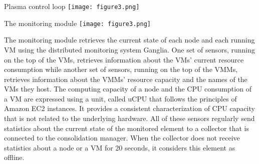 
\begin{frame}{Plasma control loop}
\texttt{[image: figure3.png]} 
\end{frame}

\begin{frame}[shrink=5]{The monitoring module
	\texttt{[image: figure3.png]} }

The monitoring module retrieves the current state
of each node and each running VM using the distributed monitoring system
\alert{Ganglia}. One set of sensors, running on the top of the VMs, retrieves
information about the VMs’ current resource consumption while another set
of sensors, running on the top of the VMMs, retrieves information about the
VMMs’ resource capacity and the names of the VMs they host.
\br \pause{}
The computing capacity of a node and the CPU consumption of a VM are expressed using a
unit, called \alert{uCPU} that follows the principles of Amazon EC2 instances. It
provides a consistent characterization of CPU capacity that is not related to the
underlying hardware.
\br \pause{}
All of these sensors regularly send statistics about the
current state of the monitored element to a collector that is connected to the
consolidation manager. When the collector does not receive statistics about a
node or a VM for 20 seconds, it considers this element as offline.

\end{frame}

